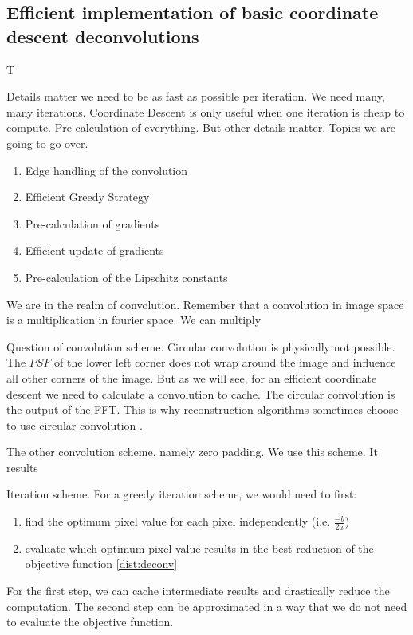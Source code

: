 \subsection{Efficient implementation of basic coordinate descent deconvolutions}\label{cd:efficient}

T

Details matter we need to be as fast as possible per iteration. We need many, many iterations.
Coordinate Descent is only useful when one iteration is cheap to compute.
Pre-calculation of everything. But other details matter. Topics we are going to go over.


\begin{enumerate}
	\item Edge handling of the convolution
	\item Efficient Greedy Strategy
	\item Pre-calculation of gradients
	\item Efficient update of gradients
	\item Pre-calculation of the Lipschitz constants
\end{enumerate}


We are in the realm of convolution. Remember that a convolution in image space is a multiplication in fourier space.
We can multiply




Question of convolution scheme. 
Circular convolution is physically not possible. The $PSF$ of the lower left corner does not wrap around the image and influence all other corners of the image. But as we will see, for an efficient coordinate descent we need to calculate a convolution to cache. The circular convolution is the output of the FFT. This is why reconstruction algorithms sometimes choose to use circular convolution \cite{ferrari2014distributed}.

The other convolution scheme, namely zero padding. We use this scheme. It results 

Iteration scheme. For a greedy iteration scheme, we would need to first:
\begin{enumerate}
	\item find the optimum pixel value for each pixel independently (i.e. $\frac{-b}{2a}$)
	\item evaluate which optimum pixel value results in the best reduction of the objective function \eqref{dist:deconv}
\end{enumerate}

For the first step, we can cache intermediate results and drastically reduce the computation. The second step can be approximated in a way that we do not need to evaluate the objective function.

